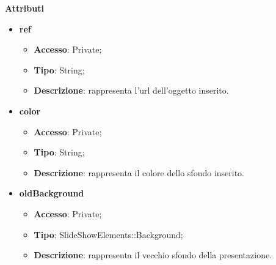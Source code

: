 {{{	\textbf{Attributi}
	\begin{itemize}
		\item \textbf{ref}
		\begin{itemize}
			\item \textbf{Accesso}: Private;
			\item \textbf{Tipo}: String;
			\item \textbf{Descrizione}: rappresenta l’url dell’oggetto inserito.
		\end{itemize}
		\item \textbf{color}
		\begin{itemize}
			\item \textbf{Accesso}: Private;
			\item \textbf{Tipo}: String;
			\item \textbf{Descrizione}: rappresenta il colore dello sfondo inserito.
		\end{itemize}
		\item \textbf{oldBackground}
		\begin{itemize}
			\item \textbf{Accesso}: Private;
			\item \textbf{Tipo}: SlideShowElements::Background;
			\item \textbf{Descrizione}: rappresenta il vecchio sfondo della presentazione.
		\end{itemize}
	\end{itemize}
	
}}}
